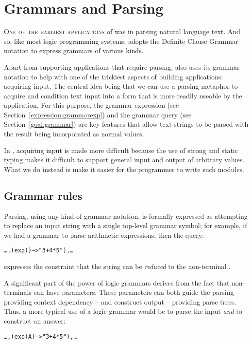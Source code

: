 \chapter{Grammars and Parsing}
\label{grammar}
\lettrine[nindent=0.1em]{O}{ne of the earliest applications} of \prolog was in parsing natural language text. And so, like most logic programming systems, \go adopts the Definite Clause Grammar notation to express grammars of various kinds.

Apart from supporting applications that require parsing, \go also uses its grammar notation to help with one of the trickiest aspects of building applications: acquiring input. The central idea being that we can use a parsing metaphor to acquire and condition text input into a form that is more readily useable by the application.  For this purpose, the grammar expression (see Section~\vref{expression:grammarexp}) and the grammar query (see Section~\vref{goal:grammar}) are key features that allow text strings to be parsed with the result being incorporated as normal values.

\begin{aside}
In \go, acquiring input is made more difficult because the use of strong and static typing makes it difficult to support general input and output of arbitrary values. What we do instead is make it easier for the programmer to write such modules.
\end{aside}

\section{Grammar rules}
\label{grammar:rule}
Parsing, using any kind of grammar notation, is formally expressed as attempting to replace an input string with a single top-level grammar symbol; for example, if we had a grammar to parse arithmetic expressions, then the query:
\begin{alltt}
\ldots,(exp() --> "3+4*5"),\ldots
\end{alltt}
expresses the constraint that the string  can be \emph{reduced} to the non-terminal . 

A significant part of the power of logic grammars derives from the fact that non-terminals can have parameters. These parameters can both guide the parsing -- providing context dependency -- and construct output -- providing parse trees. Thus, a more typical use of a logic grammar would be to parse the input \emph{and} to construct an answer:
\begin{alltt}
\ldots,(exp(A) --> "3+4*5"),\ldots
\end{alltt}

